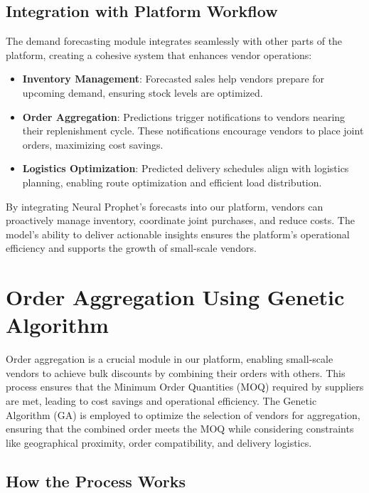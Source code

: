 \subsection{Integration with Platform Workflow}

The demand forecasting module integrates seamlessly with other parts of the platform, creating a cohesive system that enhances vendor operations:

\begin{itemize}
    \item \textbf{Inventory Management}: Forecasted sales help vendors prepare for upcoming demand, ensuring stock levels are optimized.
    \item \textbf{Order Aggregation}: Predictions trigger notifications to vendors nearing their replenishment cycle. These notifications encourage vendors to place joint orders, maximizing cost savings.
    \item \textbf{Logistics Optimization}: Predicted delivery schedules align with logistics planning, enabling route optimization and efficient load distribution.
\end{itemize}

By integrating Neural Prophet’s forecasts into our platform, vendors can proactively manage inventory, coordinate joint purchases, and reduce costs. The model’s ability to deliver actionable insights ensures the platform’s operational efficiency and supports the growth of small-scale vendors.

\section{Order Aggregation Using Genetic Algorithm}

Order aggregation is a crucial module in our platform, enabling small-scale vendors to achieve bulk discounts by combining their orders with others. This process ensures that the Minimum Order Quantities (MOQ) required by suppliers are met, leading to cost savings and operational efficiency. The Genetic Algorithm (GA) is employed to optimize the selection of vendors for aggregation, ensuring that the combined order meets the MOQ while considering constraints like geographical proximity, order compatibility, and delivery logistics.

\subsection{How the Process Works}

